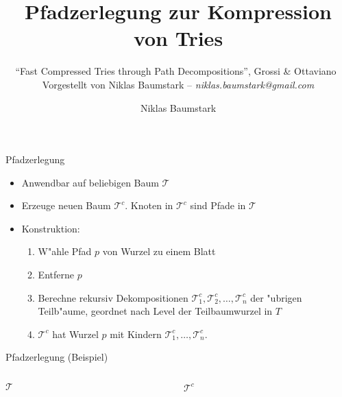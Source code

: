 \documentclass[ngerman,hyperref={pdfpagelabels=true}]{beamer}
\title{Pfadzerlegung zur Kompression von Tries}
\subtitle{
``Fast Compressed Tries through Path Decompositions'',
Grossi \& Ottaviano~\cite{tries} \\[1em]
Vorgestellt von Niklas Baumstark -- \textit{niklas.baumstark@gmail.com}
}
\author{Niklas Baumstark}
\institute{ITI-Sanders}
\newcommand\T{\mathcal{T}}
\begin{document}


\setlength\textheight{7cm} %

\begin{frame}
  \maketitle
\end{frame}


\begin{frame}{Pfadzerlegung}
\begin{itemize}
\item Anwendbar auf beliebigen Baum $\T$
\item Erzeuge neuen Baum $\T^c$. Knoten in $\T^c$ sind Pfade in $\T$
\item Konstruktion:
\begin{enumerate}
\item W"ahle Pfad $p$ von Wurzel zu einem Blatt
\item Entferne $p$
\item Berechne rekursiv Dekompositionen $\T^c_1, \T^c_2, \ldots, \T^c_n$ der "ubrigen Teilb"aume,
geordnet nach Level der Teilbaumwurzel in $T$
\item $\T^c$ hat Wurzel $p$ mit Kindern $\T^c_1, \ldots, \T^c_n$.
\end{enumerate}
\end{itemize}
\end{frame}

\begin{frame}{Pfadzerlegung (Beispiel)}

\begin{columns}[T] %
\begin{column}{.48\textwidth}

\centering
$\T$\\[1em]


\end{column}%
\hfill%
\begin{column}{.48\textwidth}

\centering
$\T^c$\\[1em]


\end{column}%
\end{columns}

\end{frame}
\end{document}
